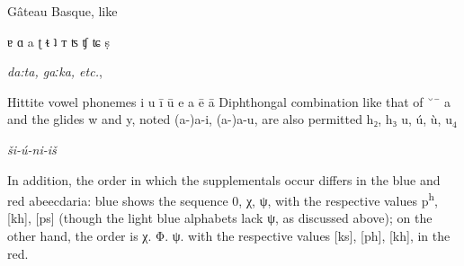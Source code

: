 Gâteau Basque, like


ɐ ɑ a ʈ ᵵ ʇ ᴛ ʦ ʧ ʨ ṣ

\textit{da:ta, gaːka, etc.}, 

Hittite vowel phonemes
{\obeylines\large\panunicode
i u ī ū
e a ē ā 
}
Diphthongal combination like that of ˘¯ a and the glides w and y, noted (a-)a-i, (a-)a-u, are
also permitted h₂, h₃
 u, ú, ù, u$_4$


\emph{ši-ú-ni-iš} 

In addition, the order in which the supplementals occur differs in the blue
and red abeecdaria: blue shows the sequence 0, χ, ψ, with the respective values
p\textsuperscript{h}, [kh], [ps] (though the light blue alphabets lack ψ, as discussed above); on
the other hand, the order is χ. Φ. ψ. with the respective values [ks], [ph], [kh],
in the red.
